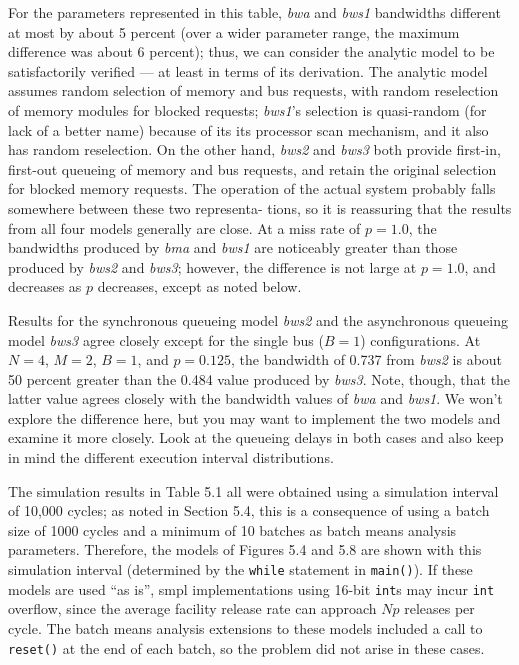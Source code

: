For the parameters represented in this table, \emph{bwa} and \emph{bws1} bandwidths
different at most by about 5 percent (over a wider parameter range, the
maximum difference was about 6 percent); thus, we can consider the analytic
model to be satisfactorily verified --- at least in terms of its derivation. The
analytic model assumes random selection of memory and bus requests, with
random reselection of memory modules for blocked requests; \emph{bws1}'s selection
is quasi-random (for lack of a better name) because of its its processor scan
mechanism, and it also has random reselection. On the other hand, \emph{bws2} and
\emph{bws3} both provide first-in, first-out queueing of memory and bus requests, and
retain the original selection for blocked memory requests. The operation of
the actual system probably falls somewhere between these two representa-
\noindent tions, so it is reassuring that the results from all four models generally are
close. At a miss rate of $p=1.0$, the bandwidths produced by \emph{bma} and \emph{bws1}
are noticeably greater than those produced by \emph{bws2} and \emph{bws3}; however, the
difference is not large at $p=1.0$, and decreases as $p$ decreases, except as noted
below.

Results for the synchronous queueing model \emph{bws2} and the asynchronous
queueing model \emph{bws3} agree closely except for the single bus ($B=1$) configurations.
At $N=4$, $M=2$, $B=1$, and $p=0.125$, the bandwidth of 0.737 from \emph{bws2} is
about 50 percent greater than the 0.484 value produced by \emph{bws3}. Note,
though, that the latter value agrees closely with the bandwidth values of
\emph{bwa} and \emph{bws1}. We won't explore the difference here, but you may want to
implement the two models and examine it more closely. Look at the queueing
delays in both cases and also keep in mind the different execution interval
distributions.

The simulation results in Table 5.1 all were obtained using a simulation
interval of 10,000 cycles; as noted in Section 5.4, this is a consequence of using
a batch size of 1000 cycles and a minimum of 10 batches as batch means
analysis parameters. Therefore, the models of Figures 5.4 and 5.8 are shown
with this simulation interval (determined by the \texttt{while} statement in
\texttt{main()}). If these models are used ``as is'', smpl implementations using 16-bit
\texttt{int}s may incur \texttt{int} overflow, since the average facility release rate can
approach $Np$ releases per cycle. The batch means analysis extensions to
these models included a call to \texttt{reset()} at the end of each batch, so the
problem did not arise in these cases.

